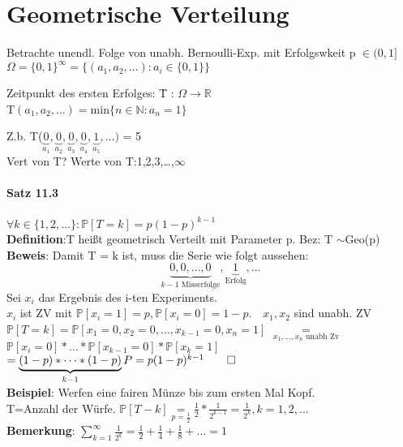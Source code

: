 \chapter{Geometrische Verteilung}
Betrachte unendl. Folge von unabh. Bernoulli-Exp. mit Erfolgswkeit p $\in(0,1]$\\
$\Omega = \{0,1\}^\infty= \{(a_1,a_2,\dots):a_i \in \{0,1\}\}$\smallskip\\
\begin{tabbing}
	Zeitpunkt des ersten Erfolges: \= T : $\Omega \rightarrow\mathds{R}$\\
	\> T$(a_1,a_2,\dots)=\text{min}\{n \in \mathds{N}:a_n = 1\}$
\end{tabbing}
Z.b. T($\underbrace{0}_{a_1}, \underbrace{0}_{a_2} , \underbrace{0}_{a_3}, \underbrace{0}_{a_4}, \underbrace{1}_{a_5},\dots)$ = 5\\
Vert von T? Werte von T:1,2,3,\dots,$\infty$\medskip\\
\subsubsection{Satz 11.3}
$\forall k \in \{1,2,\dots\}:\mathds{P}[T=k]=p(1-p)^{k-1}$\smallskip\\
\textbf{Definition}:T heißt geometrisch Verteilt mit Parameter p. Bez: T $\sim $Geo(p)\smallskip\\
\textbf{Beweis}: Damit T = k ist, muss die Serie wie folgt aussehen: 
$$\underbrace{0,0,\dots,0}_{k-1 \text{ Misserfolge}},\underbrace{1}_\text{Erfolg},\dots$$
Sei $x_i$ das Ergebnis des i-ten Experiments.\\
$x_i$ ist ZV mit $\mathds{P}[x_i=1]=p, \mathds{P}[x_i=0]=1-p. \quad x_1,x_2 $ sind unabh. ZV\smallskip\\
$\mathds{P}[T=k] = \mathds{P}[x_1=0,x_2=0,\dots,x_{k-1}=0,x_n=1] $
$\underset{x_1,\dots,x_n \text{ unabh Zv}}{=} $\\$\mathds{P}[x_i = 0]* \dots * \mathds{P}[x_{k-1}=0]*\mathds{P}[x_k=1]$\medskip\\
$=\underbrace{(1-p)*\dots*(1-p)}_{k-1}P=p(1-p)^{k-1}\qed$\medskip\\
\textbf{Beispiel}: Werfen eine fairen Münze bis zum ersten Mal Kopf.\\
T=Anzahl der Würfe. $\mathds{P}[T-k] \underset{p=\frac{1}{2}}{=}\frac{1}{2}*\frac{1}{2^{k-1}}=\frac{1}{2^k},k=1,2,\dots$\medskip\\
\textbf{Bemerkung}: $\sum_{k=1}^\infty \frac{1}{2^k}=\frac{1}{2}+\frac{1}{4}+\frac{1}{8}+\dots = 1$\smallskip\\
\medskip\\
